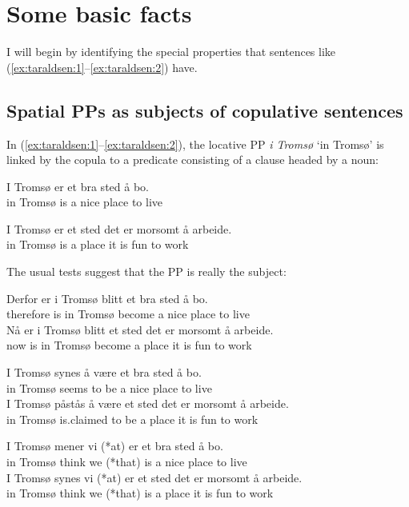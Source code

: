 \documentclass[output=paper]{LSP/langsci}
\begin{document}
\section{Some basic facts}\label{sec:taraldsen:2}

I will begin by identifying the special properties that sentences like (\ref{ex:taraldsen:1}--\ref{ex:taraldsen:2}) have.

\subsection{Spatial PPs as subjects of copulative sentences}\label{sec:taraldsen:2.1}

In (\ref{ex:taraldsen:1}--\ref{ex:taraldsen:2}), the locative PP \textit{i Tromsø} `in Tromsø' is linked by the copula to a predicate consisting of a  clause headed by a noun:

\ea%
    \label{ex:taraldsen:3}
    \gll I Tromsø er et bra sted å bo.\\
       in Tromsø is a nice place to live \\
\z

\ea
	\label{ex:taraldsen:4}
	\gll   I Tromsø er et sted det er morsomt å arbeide.\\
	      in Tromsø is a place it is fun to work\\
\z

The usual tests suggest that the PP is really the subject:

\ea%
    \label{ex:taraldsen:5}
    \ea\gll Derfor er i Tromsø blitt et bra sted å bo.\\
	    therefore is in Tromsø become a nice place to live\\
    \ex\gll Nå er i Tromsø blitt et sted det er morsomt å arbeide.\\
         now is in Tromsø become a place it is fun  to work\\
         \z
\z


\ea%
    \label{ex:taraldsen:6}
  \ea 	\gll  I Tromsø synes å være et bra sted å bo.\\
	      in Tromsø seems to be  a  nice place to live\\
  \ex	\gll I Tromsø påstås å være et sted det er morsomt å arbeide.\\
	    in Tromsø is.claimed to be a place it is fun     to work\\
\z\z


\ea%
    \label{ex:taraldsen:7}
	  \ea\gll I Tromsø mener vi (*at)  er et bra sted å bo.\\
		  in Tromsø think we (*that) is a nice place to live\\
	  \ex\gll I Tromsø synes vi (*at) er et sted det er morsomt å arbeide.\\
		  in Tromsø think we (*that) is a place it is fun      to work\\
\z\z
\end{document}
